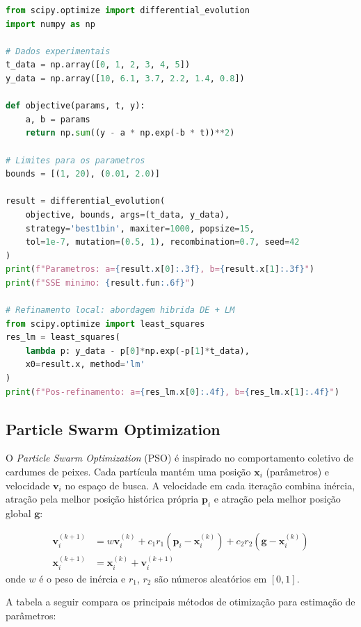 \begin{lstlisting}[language=Python, caption=Otimizacao global com Differential Evolution]
from scipy.optimize import differential_evolution
import numpy as np

# Dados experimentais
t_data = np.array([0, 1, 2, 3, 4, 5])
y_data = np.array([10, 6.1, 3.7, 2.2, 1.4, 0.8])

def objective(params, t, y):
    a, b = params
    return np.sum((y - a * np.exp(-b * t))**2)

# Limites para os parametros
bounds = [(1, 20), (0.01, 2.0)]

result = differential_evolution(
    objective, bounds, args=(t_data, y_data),
    strategy='best1bin', maxiter=1000, popsize=15,
    tol=1e-7, mutation=(0.5, 1), recombination=0.7, seed=42
)
print(f"Parametros: a={result.x[0]:.3f}, b={result.x[1]:.3f}")
print(f"SSE minimo: {result.fun:.6f}")

# Refinamento local: abordagem hibrida DE + LM
from scipy.optimize import least_squares
res_lm = least_squares(
    lambda p: y_data - p[0]*np.exp(-p[1]*t_data),
    x0=result.x, method='lm'
)
print(f"Pos-refinamento: a={res_lm.x[0]:.4f}, b={res_lm.x[1]:.4f}")
\end{lstlisting}

\subsection{Particle Swarm Optimization}

O \emph{Particle Swarm Optimization} (PSO) é inspirado no comportamento coletivo de
cardumes de peixes. Cada partícula mantém uma posição $\mathbf{x}_i$ (parâmetros) e
velocidade $\mathbf{v}_i$ no espaço de busca. A velocidade em cada iteração combina
inércia, atração pela melhor posição histórica própria $\mathbf{p}_i$ e atração pela melhor
posição global $\mathbf{g}$:

\begin{align}
\mathbf{v}_i^{(k+1)} &= w \mathbf{v}_i^{(k)} + c_1 r_1 (\mathbf{p}_i - \mathbf{x}_i^{(k)}) + c_2 r_2 (\mathbf{g} - \mathbf{x}_i^{(k)}) \\
\mathbf{x}_i^{(k+1)} &= \mathbf{x}_i^{(k)} + \mathbf{v}_i^{(k+1)}
\end{align}
onde $w$ é o peso de inércia e $r_1$, $r_2$ são números aleatórios em $[0,1]$.

A tabela a seguir compara os principais métodos de otimização para estimação de parâmetros:

